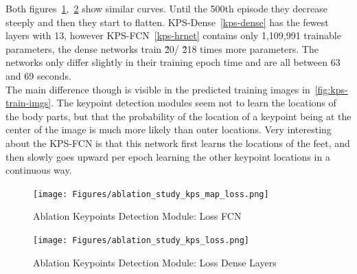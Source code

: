 Both figures~\ref{fig:kps-map-loss},~\ref{fig:kps-loss} show similar curves.
Until the 500th episode they decrease steeply and then they start to flatten.
KPS-Dense~\ref{kps-dense} has the fewest layers with 13, however KPS-FCN~\ref{kps-hrnet} contains only 1,109,991
trainable parameters, the dense networks train \~20/ \~218 times more parameters.
The networks only differ slightly in their training epoch time and are all between 63 and 69 seconds.\\
The main difference though is visible in the predicted training images in~\ref{fig:kps-train-imgs}.
The keypoint detection modules seem not to learn the locations of the body parts, but that the probability of the location
of a keypoint being at the center of the image is much more likely than outer locations.
Very interesting about the KPS-FCN is that this network first learns the locations of the feet, and then slowly goes
upward per epoch learning the other keypoint locations in a continuous way.


\begin{figure}[H]
    \centering
    \texttt{[image: Figures/ablation\_study\_kps\_map\_loss.png]}
    \decoRule
    \caption[Ablation Keypoints Detection Module: Loss FCN]{Ablation Keypoints Detection Module: Loss FCN}
    \label{fig:kps-map-loss}
\end{figure}


\begin{figure}[H]
    \centering
    \texttt{[image: Figures/ablation\_study\_kps\_loss.png]}
    \decoRule
    \caption[Ablation Keypoints Detection Module: Loss Dense Layers]{Ablation Keypoints Detection Module: Loss Dense Layers}
    \label{fig:kps-loss}
\end{figure}





